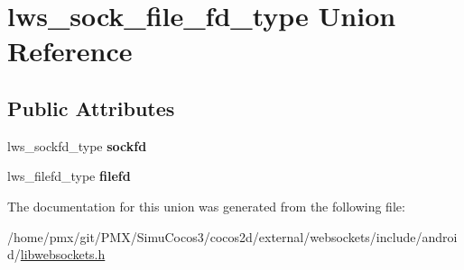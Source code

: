 \hypertarget{unionlws__sock__file__fd__type}{}\section{lws\+\_\+sock\+\_\+file\+\_\+fd\+\_\+type Union Reference}
\label{unionlws__sock__file__fd__type}
\subsection*{Public Attributes}
\begin{DoxyCompactItemize}
\item 
\mbox{\label{unionlws__sock__file__fd__type_aab7ce2251685eb2cc582306784c8b48b}} 
lws\+\_\+sockfd\+\_\+type {\bfseries sockfd}
\item 
\mbox{\label{unionlws__sock__file__fd__type_ab48f406fef707e2ff750741debc0752a}} 
lws\+\_\+filefd\+\_\+type {\bfseries filefd}
\end{DoxyCompactItemize}


The documentation for this union was generated from the following file\+:\begin{DoxyCompactItemize}
\item 
/home/pmx/git/\+P\+M\+X/\+Simu\+Cocos3/cocos2d/external/websockets/include/android/\hyperlink{_2cocos2d_2external_2websockets_2include_2android_2libwebsockets_8h}{libwebsockets.\+h}\end{DoxyCompactItemize}
